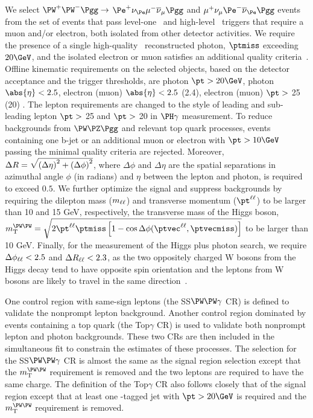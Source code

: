 We select $\PW^+\PW^-\Pgg\to$ $\Pe^+\nu_{\Pe}\mu^-\overline{\nu}_{\mu}\Pgg$ and $\mu^+\nu_{\mu}\Pe^-\overline{\nu}_{\Pe}\Pgg$ events from the set of events that pass level-one~\cite{Sirunyan:2020zal} and high-level~\cite{Khachatryan:2016bia} triggers that require a muon and/or electron, both isolated from other detector activities. We require the presence of a single high-quality~\cite{CMS:EGM-14-001} reconstructed photon, $\ptmiss$ exceeding $20\GeV$, and the isolated electron or muon satisfies an additional quality criteria~\cite{Sirunyan:2018,Khachatryan:2015hwa}. Offline kinematic requirements on the selected objects, based on the detector acceptance and the trigger thresholds, are photon $\pt>20\GeV$, photon $\abs{\eta}<2.5$, electron (muon) $\abs{\eta}< 2.5$ (2.4), electron (muon) $\pt > $ 25 (20) \GeV. The lepton requirements are changed to the style of leading and sub-leading lepton $\pt>$ 25 \GeV and $\pt>$ 20 \GeV in $\PH\gamma$ measurement. To reduce backgrounds from $\PW\PZ\Pgg$ and relevant top quark processes, events containing one b-jet or an additional muon or electron with $\pt > 10\GeV$ passing the minimal quality criteria are rejected. Moreover, $\Delta R = \sqrt{\smash[b]{\left(\Delta\eta\right)^2 + \left(\Delta\phi\right)^2}}$, where $\Delta \phi$ and $\Delta \eta$ are the spatial separations in azimuthal angle $\phi$ (in radians) and $\eta$ between the lepton and photon, is required to exceed $0.5$. We further optimize the signal and suppress backgrounds by requiring the dilepton mass ($m_{\ell\ell}$) and transverse momentum ($\ptll$) to be larger than 10 and 15 GeV, respectively, the transverse mass of the Higgs boson, $\mTWW = \sqrt{2 \ptll \ptmiss \left[1 - \cos\Delta\phi(\ptvecll, \ptvecmiss)\right]}$ to be larger than 10 GeV. Finally, for the measurement of the Higgs plus photon search, we require $\Delta\phi_{\ell\ell}<2.5$ and $\Delta R_{\ell\ell}<2.3$, as the two oppositely charged W bosons from the Higgs decay tend to have opposite spin orientation and the leptons from W bosons are likely to travel in the same direction~\cite{Dittmar:1996ss}.

One control region with same-sign leptons (the SS$\PW\PW\gamma$ CR) is defined to validate the nonprompt lepton background. Another control region dominated by events containing a top quark (the Top$\gamma$ CR) is used to validate both nonprompt lepton and photon backgrounds. These two CRs are then included in the simultaneous fit to constrain the estimates of these processes. The selection for the SS$\PW\PW\gamma$ CR is almost the same as the signal region selection except that the $\mTWW$ requirement is removed and the two leptons are required to have the same charge. The definition of the Top$\gamma$ CR also follows closely that of the signal region except that 
at least one {\cPqb}-tagged jet with $\pt > 20\GeV$ is required and the $\mTWW$ requirement is removed. 

